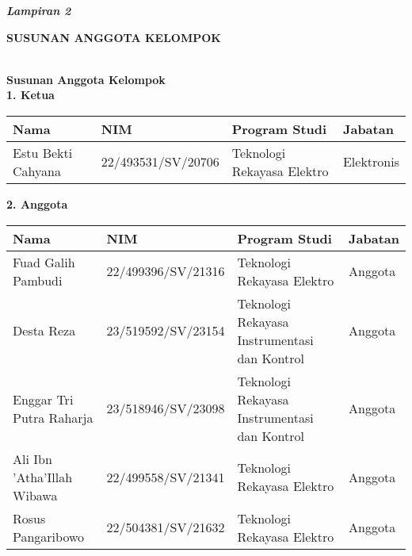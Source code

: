 \setcounter{section}{0} %
\renewcommand{\thesection}{\Alph{section}}
\renewcommand{\thesubsection}{\arabic{subsection}}

\textbf{\textit{Lampiran 2}}\\

\begin{center}
        \textbf{\MakeUppercase{\large{susunan anggota kelompok}}}\\
        \textbf{\MakeUppercase{\normalsize{\judulproyek}}}\\[1cm]
\end{center}

\textbf{\large{Susunan Anggota Kelompok}}\\[0.5cm]
\noindent \textbf{1. Ketua}

\begin{tabular}{|m{4cm}|m{4cm}|m{3cm}|m{3cm}|} 
    \hline
    \textbf{Nama} & \textbf{NIM} & \textbf{Program Studi} & \textbf{Jabatan} \\ 
    \hline
     Estu Bekti Cahyana& 22/493531/SV/20706 & Teknologi Rekayasa Elektro& Elektronis \\ 
    \hline
\end{tabular}

\vspace{0.5cm}

\noindent \textbf{2. Anggota}

\begin{tabular}{|m{4cm}|m{4cm}|m{3cm}|m{3cm}|} 
    \hline
    \textbf{Nama} & \textbf{NIM} & \textbf{Program Studi} & \textbf{Jabatan} \\ 
    \hline
     Fuad Galih Pambudi & 22/499396/SV/21316 & Teknologi Rekayasa Elektro & Anggota \\ 
    \hline
    Desta Reza & 23/519592/SV/23154 & Teknologi Rekayasa Instrumentasi dan Kontrol & Anggota\\\hline
    Enggar Tri Putra Raharja & 23/518946/SV/23098 & Teknologi Rekayasa Instrumentasi dan Kontrol & Anggota\\\hline
    Ali Ibn 'Atha'Illah Wibawa & 22/499558/SV/21341 & Teknologi Rekayasa Elektro& Anggota\\\hline
    Rosus Pangaribowo & 22/504381/SV/21632 & Teknologi Rekayasa Elektro & Anggota\\\hline
\end{tabular}

